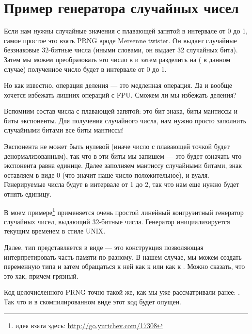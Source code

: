 \section{Пример генератора случайных чисел}
\label{FPU_PRNG}

Если нам нужны случайные значения с плавающей запятой в интервале от 0 до 1, самое простое это взять
\ac{PRNG} вроде Mersenne twister.
Он выдает случайные беззнаковые 32-битные числа (иными словами, он выдает 32 случайных бита).
Затем мы можем преобразовать это число в \Tfloat и затем разделить на  ( в данном случае)\EMDASH{}
полученное число будет в интервале от 0 до 1.

Но как известно, операция деления --- это медленная операция. 
Да и вообще хочется избежать лишних операций с FPU.
Сможем ли мы избежать деления?

Вспомним состав числа с плавающей запятой: это бит знака, биты мантиссы и биты экспоненты. 
Для получения случайного числа, нам нужно просто заполнить случайными битами все биты мантиссы!

Экспонента не может быть нулевой (иначе число с плавающей точкой будет денормализованным), 
так что в эти биты мы запишем  --- это будет означать что экспонента равна единице.
Далее заполняем мантиссу случайными битами, знак оставляем в виде 0 (что значит наше число положительное), и вуаля.
Генерируемые числа будут в интервале от 1 до 2, так что нам еще нужно будет отнять единицу.

\newcommand{\URLXOR}{\url{http://go.yurichev.com/17308}}

В моем примере\footnote{идея взята здесь: \URLXOR} 
применяется очень простой линейный конгруэнтный генератор случайных чисел, выдающий 32-битные числа.
Генератор инициализируется текущим временем в стиле UNIX.

Далее, тип \Tfloat представляется в виде  --- это конструкция \CCpp позволяющая 
интерпретировать часть памяти по-разному. В нашем случае, мы можем создать переменную типа  
и затем обращаться к ней как к \Tfloat или как к . Можно сказать, что это хак, причем грязный.


Код целочисленного \ac{PRNG} точно такой же, как мы уже рассматривали ранее: .
Так что и в скомпилированном виде этот код будет опущен.



